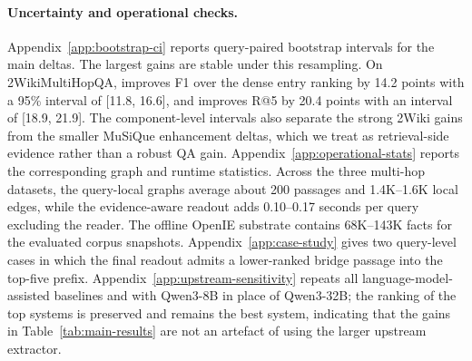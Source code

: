 \begin{table}[t]
\centering
\scriptsize
\setlength{\tabcolsep}{3pt}
\caption{Operational statistics for \methodname{} on the 1{,}000-query
multi-hop runs. Docs and facts describe the offline corpus substrate.
Local docs, local edges, graph traversal iterations, and readout time are
query-time averages before the GPT-4o-mini reader.}
\label{tab:main-efficiency}
\end{table}

\paragraph{Uncertainty and operational checks.}
Appendix~\ref{app:bootstrap-ci} reports query-paired bootstrap
intervals for the main deltas. The largest gains are stable under this
resampling. On 2WikiMultiHopQA, \methodname{} improves F1 over the dense
entry ranking by 14.2 points with a 95\% interval of [11.8, 16.6], and
improves R@5 by 20.4 points with an interval of [18.9, 21.9]. The
component-level intervals also separate the strong 2Wiki gains from the
smaller MuSiQue enhancement deltas, which we treat as retrieval-side
evidence rather than a robust QA gain. Appendix~\ref{app:operational-stats}
reports the corresponding graph and runtime statistics. Across the
three multi-hop datasets, the query-local graphs average about 200
passages and 1.4K--1.6K local edges, while the evidence-aware readout
adds 0.10--0.17 seconds per query excluding the reader. The offline
OpenIE substrate contains 68K--143K facts for the evaluated corpus
snapshots. Appendix~\ref{app:case-study} gives two query-level cases in
which the final readout admits a lower-ranked bridge passage into the
top-five prefix. Appendix~\ref{app:upstream-sensitivity} repeats all
language-model-assisted baselines and \methodname{} with Qwen3-8B in
place of Qwen3-32B; the ranking of the top systems is preserved and
\methodname{} remains the best system, indicating that the gains in
Table~\ref{tab:main-results} are not an artefact of using the larger
upstream extractor.
